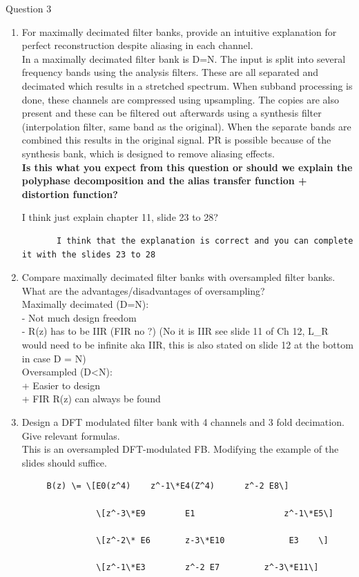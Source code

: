 \documentclass[
  a4paper,
  ,captions=tableheading
]{scrartcl}
\begin{document}
Question 3

\begin{enumerate}
\def\labelenumi{\arabic{enumi}.}
\item
  For maximally decimated filter banks, provide an intuitive explanation
  for perfect reconstruction despite aliasing in each channel.\\
  In a maximally decimated filter bank is D=N. The input is split into
  several frequency bands using the analysis filters. These are all
  separated and decimated which results in a stretched spectrum. When
  subband processing is done, these channels are compressed using
  upsampling. The copies are also present and these can be filtered out
  afterwards using a synthesis filter (interpolation filter, same band
  as the original). When the separate bands are combined this results in
  the original signal. PR is possible because of the synthesis bank,
  which is designed to remove aliasing effects.\\
  \textbf{Is this what you expect from this question or should we
  explain the polyphase decomposition and the alias transfer function +
  distortion function?}

  I think just explain chapter 11, slide 23 to 28?

\begin{lstlisting}
       I think that the explanation is correct and you can complete it with the slides 23 to 28
\end{lstlisting}
\item
  Compare maximally decimated filter banks with oversampled filter
  banks. What are the advantages/disadvantages of oversampling?\\
  Maximally decimated (D=N):\\
  - Not much design freedom\\
  - R(z) has to be IIR (FIR no ?) (No it is IIR see slide 11 of Ch 12,
  L\_R would need to be infinite aka IIR, this is also stated on slide
  12 at the bottom in case D = N)\\
  Oversampled (D\textless N):\\
  + Easier to design\\
  + FIR R(z) can always be found
\item
  Design a DFT modulated filter bank with 4 channels and 3 fold
  decimation. Give relevant formulas.\\
  This is an oversampled DFT-modulated FB. Modifying the example of the
  slides should suffice.

\begin{lstlisting}
     B(z) \= \[E0(z^4)    z^-1\*E4(Z^4)      z^-2 E8\]

               \[z^-3\*E9        E1                  z^-1\*E5\]

               \[z^-2\* E6       z-3\*E10             E3    \]

               \[z^-1\*E3        z^-2 E7         z^-3\*E11\]
\end{lstlisting}
\end{enumerate}
\end{document}
